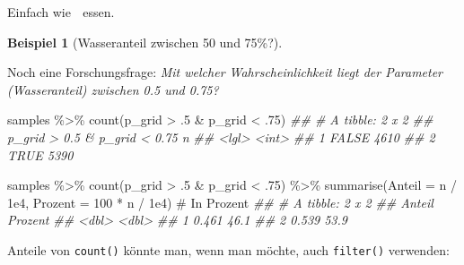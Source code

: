 \documentclass[
  a4paper,
  DIV=11]{scrreprt}
\newenvironment{Shaded}{\begin{snugshade}}{\end{snugshade}}
\newcommand{\AttributeTok}[1]{\textcolor[rgb]{0.40,0.45,0.13}{#1}}
\newcommand{\CommentTok}[1]{\textcolor[rgb]{0.37,0.37,0.37}{#1}}
\newcommand{\DecValTok}[1]{\textcolor[rgb]{0.68,0.00,0.00}{#1}}
\newcommand{\DocumentationTok}[1]{\textcolor[rgb]{0.37,0.37,0.37}{\textit{#1}}}
\newcommand{\FloatTok}[1]{\textcolor[rgb]{0.68,0.00,0.00}{#1}}
\newcommand{\FunctionTok}[1]{\textcolor[rgb]{0.28,0.35,0.67}{#1}}
\newcommand{\NormalTok}[1]{\textcolor[rgb]{0.00,0.23,0.31}{#1}}
\newcommand{\SpecialCharTok}[1]{\textcolor[rgb]{0.37,0.37,0.37}{#1}}
\theoremstyle{definition}
\newtheorem{example}{Beispiel}[chapter]
\theoremstyle{remark}
\begin{document}
Einfach wie 🍰 essen.

\leavevmode{}%
\begin{example}[Wasseranteil zwischen 50 und 75\%?]\label{exm-param2}

Noch eine Forschungsfrage: \emph{Mit welcher Wahrscheinlichkeit liegt
der Parameter (Wasseranteil) zwischen 0.5 und 0.75?}

\begin{Shaded}
\begin{Highlighting}[]
\NormalTok{samples }\SpecialCharTok{\%\textgreater{}\%} 
  \FunctionTok{count}\NormalTok{(p\_grid }\SpecialCharTok{\textgreater{}}\NormalTok{ .}\DecValTok{5} \SpecialCharTok{\&}\NormalTok{ p\_grid }\SpecialCharTok{\textless{}}\NormalTok{ .}\DecValTok{75}\NormalTok{)}
\DocumentationTok{\#\# \# A tibble: 2 x 2}
\DocumentationTok{\#\#   \textasciigrave{}p\_grid \textgreater{} 0.5 \& p\_grid \textless{} 0.75\textasciigrave{}     n}
\DocumentationTok{\#\#   \textless{}lgl\textgreater{}                          \textless{}int\textgreater{}}
\DocumentationTok{\#\# 1 FALSE                           4610}
\DocumentationTok{\#\# 2 TRUE                            5390}
\end{Highlighting}
\end{Shaded}

\begin{Shaded}
\begin{Highlighting}[]
\NormalTok{samples }\SpecialCharTok{\%\textgreater{}\%} 
  \FunctionTok{count}\NormalTok{(p\_grid }\SpecialCharTok{\textgreater{}}\NormalTok{ .}\DecValTok{5} \SpecialCharTok{\&}\NormalTok{ p\_grid }\SpecialCharTok{\textless{}}\NormalTok{ .}\DecValTok{75}\NormalTok{) }\SpecialCharTok{\%\textgreater{}\%} 
  \FunctionTok{summarise}\NormalTok{(}\AttributeTok{Anteil =}\NormalTok{ n }\SpecialCharTok{/} \FloatTok{1e4}\NormalTok{,}
            \AttributeTok{Prozent =} \DecValTok{100} \SpecialCharTok{*}\NormalTok{ n }\SpecialCharTok{/} \FloatTok{1e4}\NormalTok{)  }\CommentTok{\# In Prozent}
\DocumentationTok{\#\# \# A tibble: 2 x 2}
\DocumentationTok{\#\#   Anteil Prozent}
\DocumentationTok{\#\#    \textless{}dbl\textgreater{}   \textless{}dbl\textgreater{}}
\DocumentationTok{\#\# 1  0.461    46.1}
\DocumentationTok{\#\# 2  0.539    53.9}
\end{Highlighting}
\end{Shaded}

Anteile von \texttt{count()} könnte man, wenn man möchte, auch
\texttt{filter()} verwenden:


\end{example}
\end{document}
